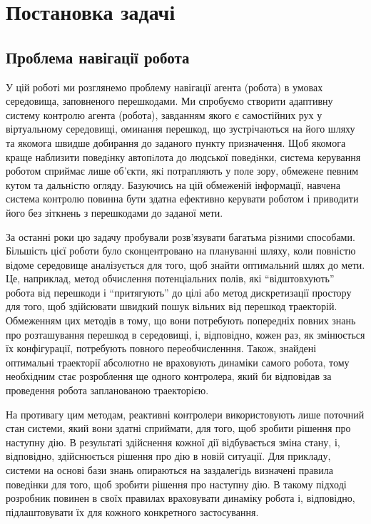 \newpage
\section{Постановка задачі}

\subsection{Проблема навігації робота}

У цій роботі ми розглянемо проблему навігації агента (робота) в умовах середовища, заповненого перешкодами. Ми спробуємо створити адаптивну систему контролю агента (робота), завданням якого є самостійних рух у віртуальному середовищі, оминання перешкод, що зустрічаються на його шляху та якомога швидше добирання до заданого пункту призначення. Щоб якомога краще наблизити поведiнку автопiлота до людської поведiнки, система керування роботом сприймає лише об’єкти, якi потрапляють у поле зору, обмежене певним кутом та дальнiстю огляду. Базуючись на цій обмеженій інформації, навчена система контролю повинна бути здатна ефективно керувати роботом і приводити його без зіткнень з перешкодами до заданої мети.

За останні роки цю задачу пробували розв'язувати багатьма різними способами. Більшість цієї роботи було сконцентровано на плануванні шляху, коли повністю відоме середовище аналізується для того, щоб знайти оптимальний шлях до мети. Це, наприклад, метод обчислення потенціальних полів, які ``відштовхують'' робота від перешкоди і ``притягують'' до цілі або метод дискретизації  простору для того, щоб здійсювати швидкий пошук вільних від перешкод траекторій. Обмеженням цих методів в тому, що вони потребують попередніх повних знань про розташування перешкод в середовищі, і, відповідно, кожен раз, як змінюється їх конфігурації, потребують повного переобчисленння. Також, знайдені оптимальні траекторії абсолютно не враховують динаміки самого робота, тому необхідним стає розроблення ще одного контролера, який би відповідав за проведення робота запланованою траекторією.

На противагу цим методам, реактивні контролери використовують лише поточний стан системи, який вони здатні сприймати, для того, щоб зробити рішення про наступну дію. В результаті здійснення кожної дії відбувається зміна стану, і, відповідно, здійснюється рішення про дію в новій ситуації. Для прикладу, системи на основі бази знань опираються на заздалегідь визначені правила поведінки для того, щоб зробити рішення про наступну дію. В такому підході розробник повинен в своїх правилах враховувати динаміку робота і, відповідно, підлаштовувати їх для кожного конкретного застосування.

